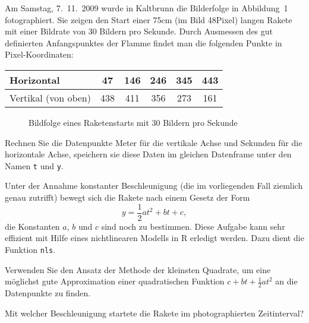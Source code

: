 Am Samstag, 7.~11.~2009 wurde in Kaltbrunn die
Bilderfolge in Abbildung~1 fotographiert. Sie zeigen den Start
einer 75cm (im Bild 48Pixel) langen Rakete mit einer Bildrate von
30 Bildern pro Sekunde.
Durch Ausmessen des gut definierten Anfangspunktes der Flamme findet
man die folgenden Punkte in Pixel-Koordinaten:
\begin{center}
\begin{tabular}{l|ccccc}
Horizontal&47&146&246&345&443\\
\hline
Vertikal (von oben)&438&411&356&273&161
\end{tabular}
\end{center}
\begin{figure}
\begin{center}
\end{center}
\caption{Bildfolge eines Raketenstarts mit 30 Bildern pro Sekunde}
\end{figure}
\begin{teilaufgaben}
\item Rechnen Sie die Datenpunkte Meter für die vertikale Achse
und Sekunden für die horizontale Achse, speichern sie diese Daten
im gleichen Datenframe unter den Namen {\tt t} und {\tt y}.
\item Unter der Annahme konstanter Beschleunigung (die im vorliegenden Fall
ziemlich genau zutrifft) bewegt sich die Rakete nach einem Gesetz
der Form
\[
y=\frac12at^2+bt+c,
\]
die Konstanten $a$, $b$ und $c$ sind noch zu bestimmen. Diese Aufgabe
kann sehr effizient mit Hilfe eines nichtlinearen Modells in R erledigt
werden. Dazu dient die Funktion {\tt nls}.
\item Verwenden Sie den Ansatz der Methode der kleinsten Quadrate, um
eine möglichst gute Approximation einer quadratischen Funktion
$c+bt+\frac12at^2$ an die Datenpunkte zu finden.
\item Mit welcher Beschleunigung startete die Rakete im photographierten
Zeitinterval?
\end{teilaufgaben}

